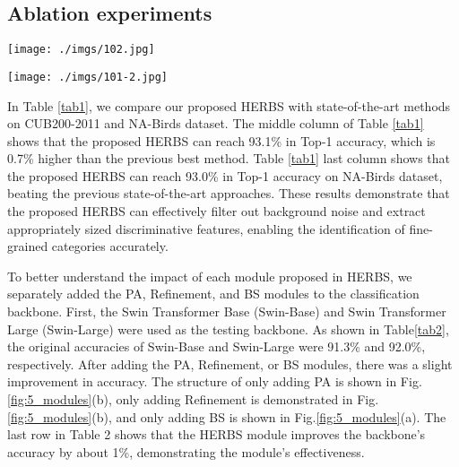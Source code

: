 \documentclass[journal]{IEEEtran}
\begin{document}
\subsection{Ablation experiments}

\begin{figure*}
    \begin{center}
    \texttt{[image: ./imgs/102.jpg]}
    \end{center} 
\caption{The structure of models, (a) original backbone, the blue box represent the backbone blokcs. (b) backbone + path aggregation module. (c) backbone + PA module with four classifiers on the last bottom-up path. (d) backbone + PA module with eight classifiers on the top-down and bottom-up path. (e) backbone + HERBS}
\label{fig:5_modules}
\end{figure*}

\begin{figure*}
    \begin{center}
    \hspace{2cm}\texttt{[image: ./imgs/101-2.jpg]}
    \end{center} 
\caption{Visualization of heat maps generated from different model. (a) original color image, (b) Swin Transformer backbone, (c) backbone + PA, (d) backbone + PA with four classifier, (e) backbone + PA with eight classifiers. (f) backbone + HERBS. The number on the top of the images represents the accuracy of the corresponding model.}
\label{fig:5_modules_heat}
\end{figure*}

In Table \ref{tab1}, we compare our proposed HERBS with state-of-the-art methods on CUB200-2011 and NA-Birds dataset. The middle column of Table \ref{tab1} shows that the proposed HERBS can reach 93.1\% in Top-1 accuracy, which is 0.7\% higher than the previous best method. Table \ref{tab1} last column shows that the proposed HERBS can reach 93.0\% in Top-1 accuracy on NA-Birds dataset, beating the previous state-of-the-art approaches. These results demonstrate that the proposed HERBS can effectively filter out background noise and extract appropriately sized discriminative features, enabling the identification of fine-grained categories accurately.

To better understand the impact of each module proposed in HERBS, we separately added the PA, Refinement, and BS modules to the classification backbone. First, the Swin Transformer Base (Swin-Base) and Swin Transformer Large (Swin-Large) were used as the testing backbone. As shown in Table\ref{tab2}, the original accuracies of Swin-Base and Swin-Large were 91.3\% and 92.0\%, respectively. After adding the PA, Refinement, or BS modules, there was a slight improvement in accuracy. The structure of only adding PA is shown in Fig.\ref{fig:5_modules}(b), only adding Refinement is demonstrated in Fig.\ref{fig:5_modules}(b), and only adding BS is shown in Fig.\ref{fig:5_modules}(a). The last row in Table 2 shows that the HERBS module improves the backbone's accuracy by about 1\%, demonstrating the module's effectiveness. 
\end{document}
